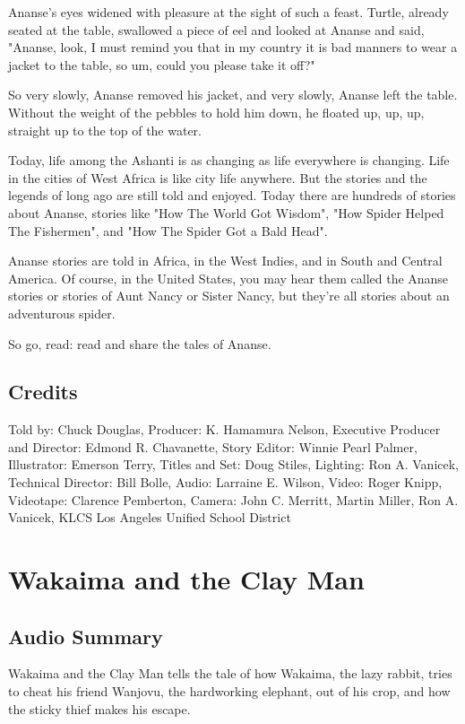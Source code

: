 Ananse's eyes widened with pleasure at the sight of such a feast. Turtle, already seated at the table, swallowed a piece of eel and looked at Ananse and said, "Ananse, look, I must remind you that in my country it is bad manners to wear a jacket to the table, so um, could you please take it off?"

So very slowly, Ananse removed his jacket, and very slowly, Ananse left the table. Without the weight of the pebbles to hold him down, he floated up, up, up, straight up to the top of the water.

Today, life among the Ashanti is as changing as life everywhere is changing. Life in the cities of West Africa is like city life anywhere. But the stories and the legends of long ago are still told and enjoyed. Today there are hundreds of stories about Ananse, stories like "How The World Got Wisdom", "How Spider Helped The Fishermen", and "How The Spider Got a Bald Head".

Ananse stories are told in Africa, in the West Indies, and in South and Central America. Of course, in the United States, you may hear them called the Ananse stories or stories of Aunt Nancy or Sister Nancy, but they're all stories about an adventurous spider.

So go, read: read and share the tales of Ananse.

\subsection{Credits}

Told by: Chuck Douglas,
Producer: K. Hamamura Nelson,
Executive Producer and Director: Edmond R. Chavanette,
Story Editor: Winnie Pearl Palmer,
Illustrator: Emerson Terry,
Titles and Set: Doug Stiles,
Lighting: Ron A. Vanicek,
Technical Director: Bill Bolle,
Audio: Larraine E. Wilson,
Video: Roger Knipp,
Videotape: Clarence Pemberton,
Camera: John C. Merritt, Martin Miller, Ron A. Vanicek,
KLCS Los Angeles Unified School District

\section{Wakaima and the Clay Man}

\subsection{Audio Summary}

Wakaima and the Clay Man tells the tale of how Wakaima, the lazy rabbit, tries to cheat his friend Wanjovu, the hardworking elephant, out of his crop, and how the sticky thief makes his escape.

